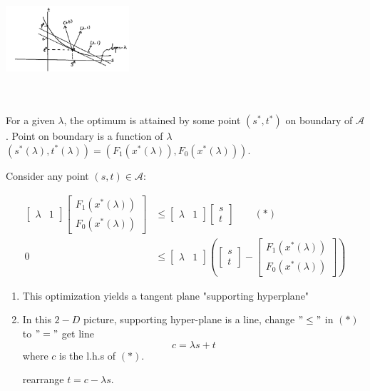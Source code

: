 \begin{marginfigure}
	\centering
	\includegraphics[width=1.8in,height=1.8in]{figures/ch10/figure1125_3.png}
\end{marginfigure}

For a given $\lambda$, the optimum is attained by some point $(s^*, t^*)$ on boundary of $\mathcal{A}$. Point on boundary is a function of $\lambda$ $(s^*(\lambda), t^*(\lambda)) = (F_1(x^*(\lambda)), F_0(x^*(\lambda)))$. 

Consider any point $(s,t)\in \mathcal{A}$:

\begin{align*}
	\begin{bmatrix}
		\lambda &1
	\end{bmatrix}
	\begin{bmatrix}
		F_1(x^*(\lambda))\\
		F_0(x^*(\lambda))
	\end{bmatrix}
	&\leq 
	\begin{bmatrix}
		\lambda &1
	\end{bmatrix}
	\begin{bmatrix}
		s\\
		t
	\end{bmatrix}\qquad  (*)\\
	0&\leq 
	\begin{bmatrix}
		\lambda & 1
	\end{bmatrix}
	\left(
	\begin{bmatrix}
		s\\
		t
	\end{bmatrix} 
	- 
	\begin{bmatrix}
		F_1(x^*(\lambda))\\
		F_0(x^*(\lambda))
	\end{bmatrix}\right)
\end{align*}

\begin{enumerate}
	\item This optimization yields a tangent plane "supporting hyperplane"
	
	\item In this $2-D$ picture, supporting hyper-plane is a line, change $"\leq"$ in $(*)$ to $"="$ get line 
	$$c =\lambda s + t$$
	where $c$ is the l.h.s of $(*)$.
	
	rearrange $t = c - \lambda s$.
\end{enumerate}


